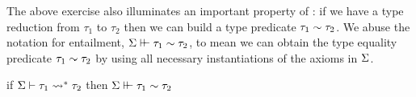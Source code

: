 \documentclass[format=acmsmall,manuscript,review,screen,nonacm,margin=1in,11pt]{acmart}
\begin{document}
\newcommand\CoFam{
  \ib{\irule[\trule{co-fam}]
    {\FamCtrs\co n \in \GEnv}
    {\many{\CoTyping {\GEnv;\VEnv} {\Co_i} {\tau_i \teq \sigma_i}}^{i<n}};
    {\CoTyping {\GEnv;\VEnv} {\FamCtrs\many\Co} {\FamCtrs\many\tau \teq \FamCtrs\many\sigma}}}}

\newcommand\CoAxiom{
  \ib{\irule[\trule{co-axiom}]
    {\substack {\AxiomTy = \many{\Forall{\many\alpha}{\FamCtrs(\FamPattern) \teq \sigma}}\\
               \Axiom\co\AxiomTy \in \GEnv}}
    {\substack {\many{\ValidType{\GEnv;\VEnv}{\tau_i}} \\
        \forall j < i.~ \nc {\AxiomTy} {i} {\many\tau} {j}}}
    {\ValidCtx{\GEnv;\VEnv}};
    {\CoTyping {\GEnv;\VEnv} {\branch i {\many\tau}} {\FamCtrs (\FamPattern\many{[\alpha_i/\tau_i]}) \teq \sigma\many{[\alpha_i/\tau_i]}}}}}

The above exercise also illuminates an important property of \CLTF:
if we have a type reduction from $\tau_1$ to $\tau_2$ then we can build a type predicate $\tau_1\mathrel{\sim}\tau_2$.
We abuse the notation for entailment, $\Sigma\vdash\hspace{-0.7ex}\vdash\tau_1\mathrel{\sim}\tau_2$, to mean we can obtain the
type equality predicate $\tau_1\mathrel{\sim}\tau_2$ by using all necessary instantiations of the axioms in $\Sigma$.
\begin{lemma}
  if $\Sigma \vdash \tau_1 \rightsquigarrow^* \tau_2$ then $\Sigma\vdash\hspace{-0.7ex}\vdash\tau_1\mathrel{\sim}\tau_2$ 
\end{lemma}
\end{document}
